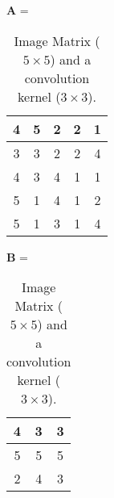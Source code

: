 \documentclass[12pt,letterpaper]{article}
\newcommand{\matr}[1]{\bm{#1}}     %
\begin{document}
\begin{table}[!ht]
    \centering
    $\matr{A}$ =  \begin{tabular}{|c|c|c|c|c|} 
    \hline
       4 & 5 & 2 & 2 & 1 \\ \hline 
       3 & 3 & 2 & 2 & 4 \\ \hline
       4 & 3 & 4 & 1 & 1 \\ \hline 
       5 & 1 & 4 & 1 & 2 \\ \hline
       5 & 1 & 3 & 1 & 4 \\ \hline
    \end{tabular}\hspace{1cm}
    $\matr{B}$ = \begin{tabular}{|c|c|c|} 
    \hline
       4 & 3 & 3 \\ \hline 
       5 & 5 & 5 \\ \hline
       2 & 4 & 3 \\ \hline 
    \end{tabular}
    \caption{Image Matrix ($5\times 5$) and a convolution kernel ($3\times 3$).}
    \label{tab1}
   
\end{table}

\newpage 
\end{document}
